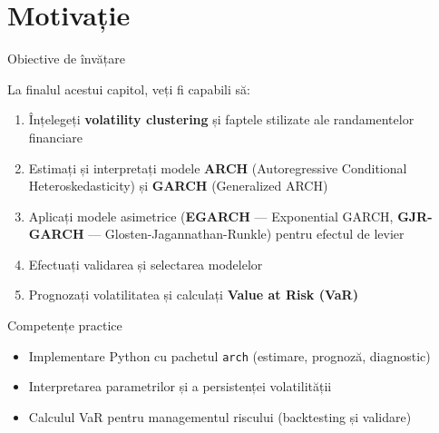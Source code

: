 \documentclass[9pt, aspectratio=169, t]{beamer}
\subtitle{Capitolul 5: Modele ARCH/GARCH pentru Volatilitate}
\begin{document}
{
\begin{frame}
    \titlepage
\end{frame}
}

\section{Motivație}

\begin{frame}{Obiective de învățare}
    \small
        \begin{block}{La finalul acestui capitol, veți fi capabili să:}
            \begin{enumerate}
                \item Înțelegeți \textbf{volatility clustering} și faptele stilizate ale randamentelor financiare
                \item Estimați și interpretați modele \textbf{ARCH} (Autoregressive Conditional Heteroskedasticity) și \textbf{GARCH} (Generalized ARCH)
                \item Aplicați modele asimetrice (\textbf{EGARCH} --- Exponential GARCH, \textbf{GJR-GARCH} --- Glosten-Jagannathan-Runkle) pentru efectul de levier
                \item Efectuați validarea și selectarea modelelor
                \item Prognozați volatilitatea și calculați \textbf{Value at Risk (VaR)}
            \end{enumerate}
        \end{block}
        \vspace{-0.15cm}
        \begin{alertblock}{Competențe practice}
            \begin{itemize}
                \item Implementare Python cu pachetul \texttt{arch} (estimare, prognoză, diagnostic)
                \item Interpretarea parametrilor și a persistenței volatilității
                \item Calculul VaR pentru managementul riscului (backtesting și validare)
            \end{itemize}
        \end{alertblock}
\end{frame}
\end{document}
